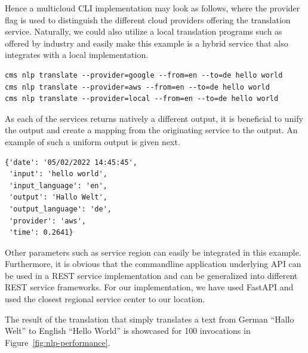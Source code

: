 Hence a multicloud CLI implementation may look as follows, where the
provider flag is used to distinguish the different cloud providers
offering the translation service. Naturally, we could also utilize a
local translation programs such as offered by industry and easily make
this example is a hybrid service that also integrates with a local
implementation.

\begin{Verbatim}[fontsize=\small]
cms nlp translate --provider=google --from=en --to=de hello world
cms nlp translate --provider=aws --from=en --to=de hello world
cms nlp translate --provider=local --from=en --to=de hello world
\end{Verbatim}


As each of the services returns natively a different output, it is
beneficial to unify the output and create a mapping from the
originating service to the output. An example of such a uniform output is given next.


\begin{Verbatim}[fontsize=\small]
{'date': '05/02/2022 14:45:45',
 'input': 'hello world',
 'input_language': 'en',
 'output': 'Hallo Welt',
 'output_language': 'de',
 'provider': 'aws',
 'time': 0.2641}
\end{Verbatim}


Other parameters such as service region can easily be integrated in
this example. Furthermore, it is obvious that the commandline
application underlying API can be used in a REST service
implementation and can be generalized into different REST service
frameworks. For our implementation, we have used FastAPI and used the
closest regional service center to our location.

The result of the translation that simply translates a text from
German ``Hallo Welt'' to English ``Hello World'' is showcased for 100
invocations in Figure~\ref{fig:nlp-performance}. 


